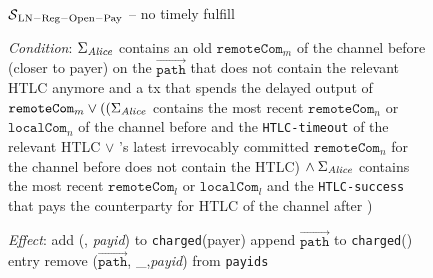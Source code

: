 \begin{figure}[H]
  \begin{simulatorbox}{$\mathcal{S}{}_{\mathrm{LN - Reg - Open - Pay}}$ -- no
  timely fulfill}
    \begin{algorithmic}[1]
      \Statex \textit{Condition}:
      \Indent
        \State $\Sigma_{\mathit{Alice}}$ contains an old $\mathtt{remoteCom}_m$ of the
        channel before \alice{} (closer to payer) on the
        $\overrightarrow{\mathtt{path}}$ that does not contain the relevant HTLC
        anymore and a tx that spends the delayed output of $\mathtt{remoteCom}_m
        \vee ((\Sigma_{\mathit{Alice}}$ contains the most recent $\mathtt{remoteCom}_n$
        or $\mathtt{localCom}_n$ of the channel before \alice{} and the
        \texttt{HTLC-timeout} of the relevant HTLC $\vee$ \alice's latest
        irrevocably committed $\mathtt{remoteCom}_n$ for the channel before
        \alice{} does not contain the HTLC) $\wedge \: \Sigma_{\mathit{Alice}}$ contains
        the most recent $\mathtt{remoteCom}_l$ or $\mathtt{localCom}_l$ and the
        \texttt{HTLC-success} that pays the counterparty for HTLC of the channel
        after \alice{})
        \label{alg:sim:resolvepay:nofulfill:cond}
      \EndIndent
      \Statex

      \Statex \textit{Effect}:
      \Indent
        \State add (\alice, \textit{payid}) to \texttt{charged}(payer)
          \State append $\overrightarrow{\mathtt{path}}$ to
          \texttt{charged}(\alice) entry
        \EndIf
        \State remove ($\overrightarrow{\mathtt{path}}$, \_,\textit{payid}) from
        \texttt{payids}
      \EndIndent
    \end{algorithmic}
  \end{simulatorbox}
  \caption{}
  \label{alg:sim:resolvepay:nofulfill}
\end{figure}

